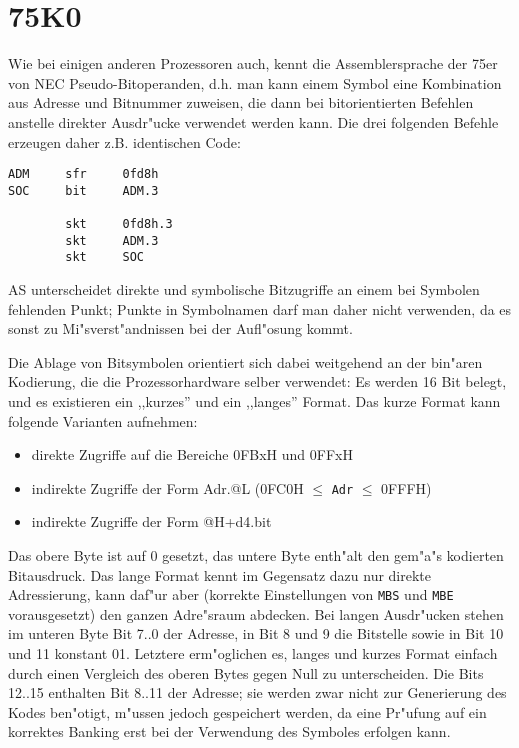 \documentclass[12pt,a4paper,twoside]{report}
\newcommand{\tty}[1]{{\tt #1}}
\begin{document}

\section{75K0}
\label{75K0Spec}

Wie bei einigen anderen Prozessoren auch, kennt die Assemblersprache
der 75er von NEC Pseudo-Bitoperanden, d.h. man kann einem Symbol
eine Kombination aus Adresse und Bitnummer zuweisen, die dann bei
bitorientierten Befehlen anstelle direkter Ausdr"ucke verwendet werden
kann.  Die drei folgenden Befehle erzeugen daher z.B. identischen
Code:
\begin{verbatim}
ADM     sfr     0fd8h
SOC     bit     ADM.3

        skt     0fd8h.3
        skt     ADM.3
        skt     SOC
\end{verbatim}
AS unterscheidet direkte und symbolische Bitzugriffe an einem
bei Symbolen fehlenden Punkt; Punkte in Symbolnamen darf man daher
nicht verwenden, da es sonst zu Mi"sverst"andnissen bei der Aufl"osung
kommt.
\par
Die Ablage von Bitsymbolen orientiert sich dabei weitgehend an der
bin"aren Kodierung, die die Prozessorhardware selber verwendet:  Es
werden 16 Bit belegt, und es existieren ein ,,kurzes'' und ein ,,langes''
Format.  Das kurze Format kann folgende Varianten aufnehmen:
\begin{itemize}
 \item{direkte Zugriffe auf die Bereiche 0FBxH und 0FFxH}
 \item{indirekte Zugriffe der Form Adr.@L (0FC0H $\leq$ \tty{Adr} $\leq$ 0FFFH)}
 \item{indirekte Zugriffe der Form @H+d4.bit}
\end{itemize}
Das obere Byte ist auf 0 gesetzt, das untere Byte enth"alt den gem"a"s
\cite{NEC75} kodierten Bitausdruck.  Das lange Format kennt im Gegensatz
dazu nur direkte Adressierung, kann daf"ur aber (korrekte Einstellungen
von \tty{MBS} und \tty{MBE} vorausgesetzt) den ganzen Adre"sraum abdecken.
Bei langen Ausdr"ucken stehen im unteren Byte Bit 7..0 der Adresse, in
Bit 8 und 9 die Bitstelle sowie in Bit 10 und 11 konstant 01.  Letztere
erm"oglichen es, langes und kurzes Format einfach durch einen Vergleich
des oberen Bytes gegen Null zu unterscheiden.  Die Bits 12..15 enthalten
Bit 8..11 der Adresse; sie werden zwar nicht zur Generierung des Kodes
ben"otigt, m"ussen jedoch gespeichert werden, da eine Pr"ufung auf ein
korrektes Banking erst bei der Verwendung des Symboles erfolgen kann.
\end{document}
